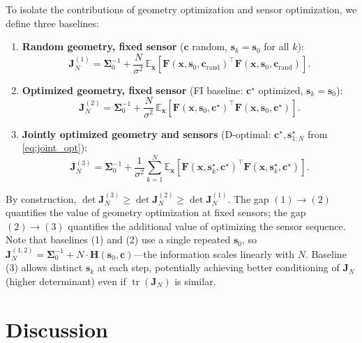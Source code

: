 \documentclass[11pt,a4paper]{article}
\newcommand{\E}{\mathbb{E}}
\newcommand{\tr}{\operatorname{tr}}
\begin{document}
To isolate the contributions of geometry optimization and sensor optimization, we define three baselines:

\begin{enumerate}
  \item \textbf{Random geometry, fixed sensor} ($\bm{c}$ random, $\bm{s}_k = \bm{s}_0$ for all $k$):
  \begin{equation}
    \bm{J}_N^{(1)} = \bm{\Sigma}_0^{-1} + \frac{N}{\sigma^2}\,\E_{\bm{x}}\!\left[\bm{F}(\bm{x}, \bm{s}_0, \bm{c}_{\text{rand}})^\top \bm{F}(\bm{x}, \bm{s}_0, \bm{c}_{\text{rand}})\right].
  \end{equation}

  \item \textbf{Optimized geometry, fixed sensor} (FI baseline: $\bm{c}^\star$ optimized, $\bm{s}_k = \bm{s}_0$):
  \begin{equation}
    \bm{J}_N^{(2)} = \bm{\Sigma}_0^{-1} + \frac{N}{\sigma^2}\,\E_{\bm{x}}\!\left[\bm{F}(\bm{x}, \bm{s}_0, \bm{c}^\star)^\top \bm{F}(\bm{x}, \bm{s}_0, \bm{c}^\star)\right].
  \end{equation}

  \item \textbf{Jointly optimized geometry and sensors} (D-optimal: $\bm{c}^\star, \bm{s}_{1:N}^\star$ from \eqref{eq:joint_opt}):
  \begin{equation}
    \bm{J}_N^{(3)} = \bm{\Sigma}_0^{-1} + \frac{1}{\sigma^2}\sum_{k=1}^{N} \E_{\bm{x}}\!\left[\bm{F}(\bm{x}, \bm{s}_k^\star, \bm{c}^\star)^\top \bm{F}(\bm{x}, \bm{s}_k^\star, \bm{c}^\star)\right].
  \end{equation}
\end{enumerate}

By construction, $\det\bm{J}_N^{(3)} \geq \det\bm{J}_N^{(2)} \geq \det\bm{J}_N^{(1)}$.  The gap $(1) \to (2)$ quantifies the value of geometry optimization at fixed sensors; the gap $(2) \to (3)$ quantifies the additional value of optimizing the sensor sequence.  Note that baselines (1) and (2) use a single repeated $\bm{s}_0$, so $\bm{J}_N^{(1,2)} = \bm{\Sigma}_0^{-1} + N \cdot \bm{H}(\bm{s}_0, \bm{c})$---the information scales linearly with $N$.  Baseline (3) allows distinct $\bm{s}_k$ at each step, potentially achieving better conditioning of $\bm{J}_N$ (higher determinant) even if $\tr(\bm{J}_N)$ is similar.

\section{Discussion}
\end{document}
